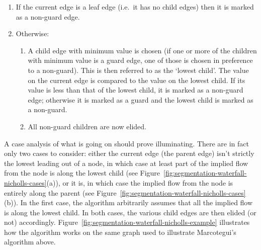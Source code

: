 \begin{enumerate}

\item If the current edge is a leaf edge (i.e.~it has no child edges) then it is marked as a non-guard edge.

\item Otherwise:

\begin{enumerate}

\item A child edge with minimum value is chosen (if one or more of the children with minimum value is a guard edge, one of those is chosen in preference to a non-guard). This is then referred to as the `lowest child'. The value on the current edge is compared to the value on the lowest child. If its value is less than that of the lowest child, it is marked as a non-guard edge; otherwise it is marked as a guard and the lowest child is marked as a non-guard.

\item All non-guard children are now elided.

\end{enumerate}

\end{enumerate}

A case analysis of what is going on should prove illuminating. There are in fact only two cases to consider: either the current edge (the parent edge) isn't strictly the lowest leading out of a node, in which case at least part of the implied flow from the node is along the lowest child (see Figure~\ref{fig:segmentation-waterfall-nicholls-cases}(a)), or it is, in which case the implied flow from the node is entirely along the parent (see Figure~\ref{fig:segmentation-waterfall-nicholls-cases}(b)). In the first case, the algorithm arbitrarily assumes that all the implied flow is along the lowest child. In both cases, the various child edges are then elided (or not) accordingly. Figure~\ref{fig:segmentation-waterfall-nicholls-example} illustrates how the algorithm works on the same graph used to illustrate Marcotegui's algorithm above.

